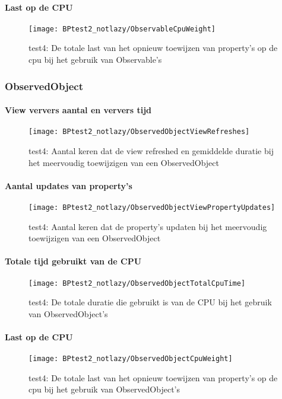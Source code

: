 \paragraph{Last op de CPU}
\begin{figure}[H]
    \centering
    \texttt{[image: BPtest2\_notlazy/ObservableCpuWeight]} 
    \caption{test4: De totale last van het opnieuw toewijzen van property's op de cpu bij het gebruik van Observable's}
    \label{fig:cpuWeightObservable3}
\end{figure}

\subsubsection{ObservedObject}
\paragraph{View ververs aantal en ververs tijd}
\begin{figure}[H]
    \centering
    \texttt{[image: BPtest2\_notlazy/ObservedObjectViewRefreshes]} 
    \caption{test4: Aantal keren dat de view refreshed en gemiddelde duratie bij het meervoudig toewijzigen van een ObservedObject}
    \label{fig:viewRefreshesObservedObject3}
\end{figure}
\paragraph{Aantal updates van property's}
\begin{figure}[H]
    \centering
    \texttt{[image: BPtest2\_notlazy/ObservedObjectViewPropertyUpdates]} 
    \caption{test4: Aantal keren dat de property's updaten bij het meervoudig toewijzigen van een ObservedObject}
    \label{fig:propertyUpdatesObservedObject3}
\end{figure}
\paragraph{Totale tijd gebruikt van de CPU}
\begin{figure}[H]
    \centering
    \texttt{[image: BPtest2\_notlazy/ObservedObjectTotalCpuTime]} 
    \caption{test4: De totale duratie die gebruikt is van de CPU bij het gebruik van ObservedObject's}
    \label{fig:cpuUsageTimeObservedObject3}
\end{figure}
\paragraph{Last op de CPU}
\begin{figure}[H]
    \centering
    \texttt{[image: BPtest2\_notlazy/ObservedObjectCpuWeight]} 
    \caption{test4: De totale last van het opnieuw toewijzen van property's op de cpu bij het gebruik van ObservedObject's}
    \label{fig:cpuWeightObservedObject3}
\end{figure}


